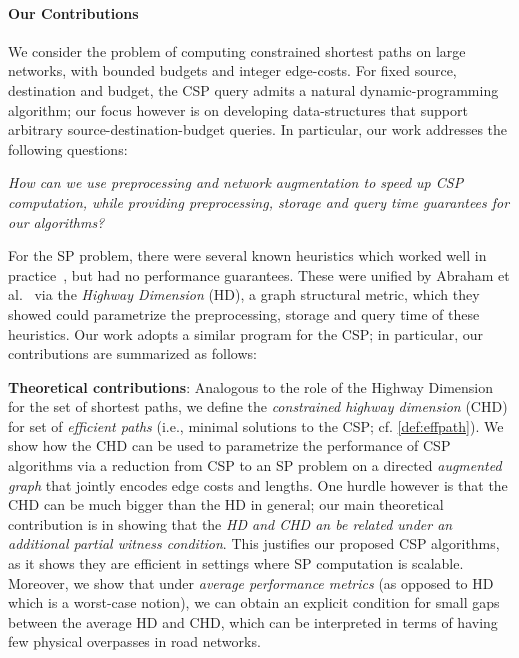 
\paragraph{Our Contributions}
We consider the problem of computing constrained shortest paths on large networks, with bounded budgets and integer edge-costs. For fixed source, destination and budget, the CSP query admits a natural dynamic-programming algorithm; our focus however is on developing data-structures that support arbitrary source-destination-budget queries. In particular, our work addresses the following questions:
\vspace{-0.1cm}
\begin{center}
\emph{How can we use preprocessing and network augmentation to speed up CSP computation, while providing preprocessing, storage and query time guarantees for our algorithms?}
\end{center}
\vspace{-0.1cm}

For the SP problem, there were several known heuristics which worked well in practice~\cite{dimacs09}, but had no performance guarantees.
These were unified by Abraham et al.~\cite{highway2013, highway2010} via the \emph{Highway Dimension} (HD), a graph structural metric, which they showed could parametrize the preprocessing, storage and query time of these heuristics.
Our work adopts a similar program for the CSP; in particular, our contributions are summarized as follows:

\noindent\textbf{Theoretical contributions}: 
Analogous to the role of the Highway Dimension for the set of shortest paths, we define the \emph{constrained highway dimension} (CHD) for set of {\em efficient paths} (i.e., minimal solutions to the CSP; cf. \cref{def:effpath}). We show how the CHD can be used to parametrize the performance of CSP algorithms via a reduction from CSP to an SP problem on a directed \emph{augmented graph} that jointly encodes edge costs and lengths. One hurdle however is that the CHD can be much bigger than the HD in general; our main theoretical contribution is in showing that the \emph{HD and CHD an be related under an additional partial witness condition}. 
This justifies our proposed CSP algorithms, as it shows they are efficient in settings where SP computation is scalable. Moreover, we show that under \emph{average performance metrics} (as opposed to HD which is a worst-case notion), we can obtain an explicit condition for small gaps between the average HD and CHD, which can be interpreted in terms of having few physical overpasses in road networks.

